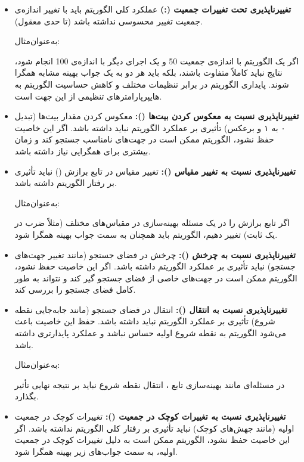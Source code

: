 \documentclass[12pt]{exam}
\begin{document}
\begin{questions}
\begin{itemize}
	 	\item \textbf{تغییرناپذیری تحت تغییرات جمعیت (:)}
	 	عملکرد کلی الگوریتم باید با تغییر اندازه‌ی جمعیت تغییر محسوسی نداشته باشد (تا حدی معقول).
	 	 
	 	به‌عنوان‌مثال:
	 	
	 	اگر یک الگوریتم با اندازه‌ی جمعیت 50 و یک اجرای دیگر با اندازه‌ی 100 انجام شود، نتایج نباید کاملاً متفاوت باشند، بلکه باید هر دو به یک جواب بهینه مشابه همگرا شوند. پایداری الگوریتم در برابر تنظیمات مختلف و کاهش حساسیت الگوریتم به هایپرپارامترهای تنظیمی از این جهت است. 
	 	
	 	\item \textbf{  تغییرناپذیری نسبت به معکوس کردن بیت‌ها ():}
	 	معکوس کردن مقدار بیت‌ها (تبدیل ۰ به ۱ و برعکس) تأثیری بر عملکرد الگوریتم نباید داشته باشد.
	 	اگر این خاصیت حفظ نشود، الگوریتم ممکن است در جهت‌های نامناسب جستجو کند و زمان بیشتری برای همگرایی نیاز داشته باشد.
	 	
	 	\item \textbf{ تغییرناپذیری نسبت به تغییر مقیاس ():}
	 	تغییر مقیاس در تابع برازش 	() نباید تأثیری بر رفتار الگوریتم داشته باشد.
	 	
	 	به‌عنوان‌مثال: 
	 	
	 	اگر تابع برازش را در یک مسئله بهینه‌سازی در مقیاس‌های مختلف (مثلاً ضرب در یک ثابت) تغییر دهیم، الگوریتم باید همچنان به سمت جواب بهینه همگرا شود.
	 	
	 	\item \textbf{تغییرناپذیری نسبت به چرخش ():}
	 	چرخش در فضای جستجو (مانند تغییر جهت‌های جستجو) نباید تأثیری بر عملکرد الگوریتم داشته باشد. اگر این خاصیت حفظ نشود، الگوریتم ممکن است در جهت‌های خاصی از فضای جستجو گیر کند و نتواند به طور کامل فضای جستجو را بررسی کند.
	 	
	 	\item \textbf{ تغییرناپذیری نسبت به انتقال ():}
	 	انتقال در فضای جستجو (مانند جابه‌جایی نقطه شروع) تأثیری بر عملکرد الگوریتم نباید داشته باشد. حفظ این خاصیت باعث می‌شود الگوریتم به نقطه شروع اولیه حساس نباشد و عملکرد پایدارتری داشته باشد.
	 	
	 	به‌عنوان‌مثال: 
	 	
	 	در مسئله‌ای مانند بهینه‌سازی تابع
	 	 ، انتقال نقطه شروع نباید بر نتیجه نهایی تأثیر بگذارد.
	 	
	 	\item \textbf{تغییرناپذیری نسبت به تغییرات کوچک در جمعیت ():}
	 	تغییرات کوچک در جمعیت اولیه (مانند جهش‌های کوچک) نباید تأثیری بر رفتار کلی الگوریتم نداشته باشد. اگر این خاصیت حفظ نشود، الگوریتم ممکن است به دلیل تغییرات کوچک در جمعیت اولیه، به سمت جواب‌های زیر بهینه همگرا شود.
	 	

\end{itemize}
\end{questions}
\end{document}
